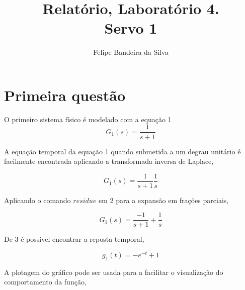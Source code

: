 \documentclass[paper=a4, fontsize=11pt]{article}
\title{Relatório, Laboratório 4.\\Servo 1}
\author{Felipe Bandeira da Silva}
\begin{document}






\newpage

\section{Primeira questão}

O primeiro sistema físico é modelado com a equação 1
\begin{equation}
    G_1(s) = \frac{1}{s+1}
\end{equation}

A equação temporal da equação 1 quando submetida a um degrau unitário
é facilmente encontrada aplicando a transformada inversa de Laplace,

\begin{equation}
    G_1(s) = \frac{1}{s+1} \frac{1}{s}
\end{equation}

Aplicando o comando $residue$ em 2 para a expansão em frações parciais,

\begin{equation}
    G_1(s) = \frac{-1}{s+1} + \frac{1}{s}
\end{equation}

De 3 é possível encontrar a reposta temporal,

\begin{equation}
    g_1(t) = -e^{-t} + 1
\end{equation}

A plotagem do gráfico pode ser usada para a facilitar o visualização
do comportamento da função,
\end{document}
